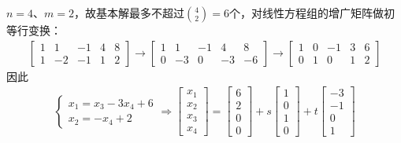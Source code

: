 \documentclass{ctexart}
\begin{document}
\begin{example}
    $n=4$、$m=2$，故基本解最多不超过$\binom{4}{2}=6$个，对线性方程组的增广矩阵做初等行变换：
    \begin{align*}
        \begin{bmatrix}
            1 & 1 & -1 & 4 & 8 \\ 1 & -2 & -1 & 1 & 2
        \end{bmatrix} \longrightarrow
        \begin{bmatrix}
            1 & 1 & -1 & 4 & 8 \\ 0 & -3 & 0 & -3 & -6
        \end{bmatrix} \longrightarrow
        \begin{bmatrix}
            1 & 0 & -1 & 3 & 6 \\ 0 & 1 & 0 & 1 & 2
        \end{bmatrix}
    \end{align*}
    因此
    \begin{align*}
        \begin{cases}
            x_1 = x_3 - 3 x_4 + 6 \\
            x_2 = - x_4 + 2
        \end{cases} \Longrightarrow
        \begin{bmatrix}
            x_1 \\ x_2 \\ x_3 \\ x_4
        \end{bmatrix} =
        \begin{bmatrix}
            6 \\ 2 \\ 0 \\ 0
        \end{bmatrix} + s
        \begin{bmatrix}
            1 \\ 0 \\ 1 \\ 0
        \end{bmatrix} + t
        \begin{bmatrix}
            -3 \\ -1 \\ 0 \\ 1
        \end{bmatrix}
    \end{align*}
\end{example}
\end{document}
